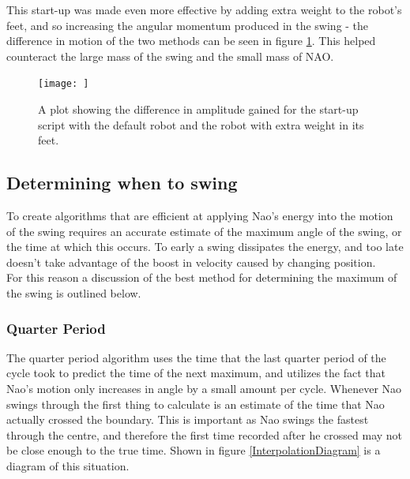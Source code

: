 \documentclass[11pt]{article}
\newcommand*\ruleline[1]{\par\noindent\raisebox{.8ex}{\makebox[\linewidth]{\hrulefill\hspace{1ex}\raisebox{-.8ex}{#1}\hspace{1ex}\hrulefill}}}
\begin{document}
This start-up was made even more effective by adding extra weight to the robot's feet, and so increasing the angular momentum produced in the swing - the difference in motion of the two methods can be seen in figure \ref{fig:startupcomparison}. This helped counteract the large mass of the swing and the small mass of NAO.


    \begin{figure}
        \centering
        \texttt{[image: ]}
        \caption{A plot showing the difference in amplitude gained for the start-up script with the default robot and the robot with extra weight in its feet.}
        \label{fig:startupcomparison}
    \end{figure}



\subsection{Determining when to swing}
\ruleline{George Sheppard}
To create algorithms that are efficient at applying Nao's energy into the motion of the swing requires an accurate estimate of the maximum angle of the swing, or the time at which this occurs. To early a swing dissipates the energy, and too late doesn't take advantage of the boost in velocity caused by changing position.\\
For this reason a discussion of the best method for determining the maximum of the swing is outlined below.

\subsubsection{Quarter Period}
\ruleline{George Sheppard}
The quarter period algorithm uses the time that the last quarter period of the cycle took to predict the time of the next maximum, and utilizes the fact that Nao's motion only increases in angle by a small amount per cycle. Whenever Nao swings through the first thing to calculate is an estimate of the time that Nao actually crossed the boundary. This is important as Nao swings the fastest through the centre, and therefore the first time recorded after he crossed may not be close enough to the true time. Shown in figure \ref{InterpolationDiagram} is a diagram of this situation. 
\end{document}

